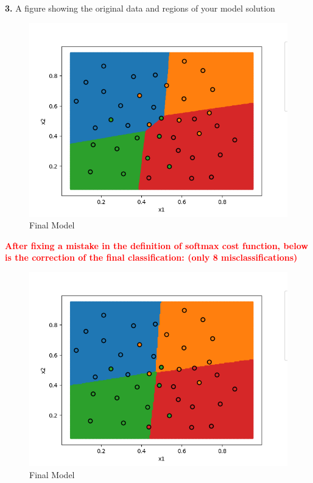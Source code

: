 \textbf{3.} A figure showing the original data and regions of your model solution
\begin{figure}[H]
    \centering
    \includegraphics[width=120mm]{classifier_label_regions.png}
    \caption{Final Model}
    \label{fig:enter-label}
\end{figure}


\textbf{\textcolor{red}{After fixing a mistake in the definition of softmax cost function, below is the correction of the final classification: (only 8 misclassifications)}}
\begin{figure}[H]
    \centering
    \includegraphics[width=120mm]{classifier_label_regions-corrected.png}
    \caption{Final Model}
    \label{fig:enter-label}
\end{figure}











